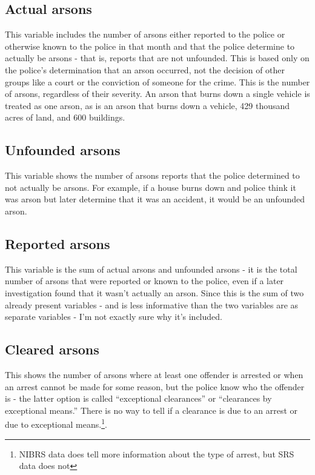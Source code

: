 \documentclass[
  12pt,
  openany]{book}
\begin{document}
\subsection{Actual arsons}\label{actual-arsons}

This variable includes the number of arsons either reported to the police or otherwise known to the police in that month and that the police determine to actually be arsons - that is, reports that are not unfounded. This is based only on the police's determination that an arson occurred, not the decision of other groups like a court or the conviction of someone for the crime. This is the number of arsons, regardless of their severity. An arson that burns down a single vehicle is treated as one arson, as is an arson that burns down a vehicle, 429 thousand acres of land, and 600 buildings.

\subsection{Unfounded arsons}\label{unfounded-arsons}

This variable shows the number of arsons reports that the police determined to not actually be arsons. For example, if a house burns down and police think it was arson but later determine that it was an accident, it would be an unfounded arson.

\subsection{Reported arsons}\label{reported-arsons}

This variable is the sum of actual arsons and unfounded arsons - it is the total number of arsons that were reported or known to the police, even if a later investigation found that it wasn't actually an arson. Since this is the sum of two already present variables - and is less informative than the two variables are as separate variables - I'm not exactly sure why it's included.

\subsection{Cleared arsons}\label{cleared-arsons}

This shows the number of arsons where at least one offender is arrested or when an arrest cannot be made for some reason, but the police know who the offender is - the latter option is called ``exceptional clearances'' or ``clearances by exceptional means.'' There is no way to tell if a clearance is due to an arrest or due to exceptional means.\footnote{NIBRS data does tell more information about the type of arrest, but SRS data does not}.
\end{document}
